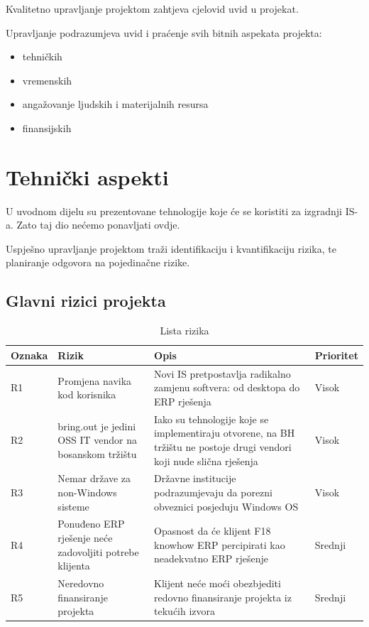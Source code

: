 \documentclass[times, utf8, seminar]{fit}
\begin{document}
Kvalitetno upravljanje projektom zahtjeva cjelovid uvid u projekat.  

Upravljanje podrazumjeva uvid i praćenje svih bitnih aspekata projekta:
\begin{itemize}
  \item tehničkih
  \item vremenskih
  \item angažovanje ljudskih i materijalnih resursa
  \item finansijskih
\end{itemize}

\pagebreak
\section{Tehnički aspekti}

U uvodnom dijelu su prezentovane tehnologije koje će se koristiti za izgradnji IS-a. Zato taj dio nećemo ponavljati ovdje.

Uspješno upravljanje projektom traži identifikaciju i kvantifikaciju rizika, te planiranje odgovora na pojedinačne rizike.

\subsection{Glavni rizici projekta}

\begin{table}[!h]
\centering
\begin{tabular}{ |p{1.5cm}|p{4cm}|p{7.5cm}|p{1.5cm}| }
\hline
Oznaka & Rizik & Opis & Prioritet  \\ \hline\hline
R1 & Promjena navika kod korisnika & Novi IS pretpostavlja radikalno zamjenu softvera: od desktopa do ERP rješenja & Visok \\ \hline
R2 & bring.out je jedini OSS IT vendor na bosanskom tržištu & Iako su tehnologije koje se implementiraju otvorene, na BH tržištu ne postoje drugi vendori koji nude slična rješenja & Visok \\ \hline
R3 & Nemar države za non-Windows sisteme & Državne institucije podrazumjevaju da porezni obveznici posjeduju Windows OS & Visok \\ \hline
R4 & Ponuđeno ERP rješenje neće zadovoljiti potrebe klijenta & Opasnost da će klijent F18 knowhow ERP percipirati kao neadekvatno ERP rješenje & Srednji \\ \hline
R5 & Neredovno finansiranje projekta & Klijent neće moći obezbjediti redovno finansiranje projekta iz tekućih izvora & Srednji \\ \hline
\end{tabular}
\caption{Lista rizika}
\end{table}
\end{document}
